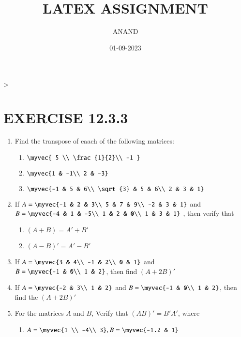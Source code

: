 \documentclass{article}
\theoremstyle{remark}
\begin{document}
\title{LATEX ASSIGNMENT}
\author{ANAND}
\date{01-09-2023}
\maketitle                                                                       >
\section*{EXERCISE 12.3.3}
\begin{enumerate}
\item Find the transpose of eaach of the following matrices:
\begin{enumerate}[label=(\roman*)]
\item $\myvec{ 5 \\ \frac{1}{2}\\ -1 }$
\item $\myvec {1 & -1\\ 2 & -3}$
\item $\myvec{-1 & 5 & 6\\ \sqrt{3} & 5 & 6\\ 2 & 3 & 1}$
\end{enumerate}
\item If $A=\myvec {-1 & 2 & 3\\ 5 & 7 & 9\\ -2 & 3 & 1}$ and $B= \myvec{-4 & 1 & -5\\ 1 & 2 & 0\\ 1 & 3 & 1}$
, then verify that
\begin{enumerate}
\item $(A+B)=A'+B'$
\item $(A-B)'=A'-B'$
\end{enumerate}
\item If $A=\myvec{3 & 4\\ -1 & 2\\ 0 & 1}$ and $B=\myvec{-1 & 0\\ 1 & 2}$, then find $(A+2B)'$
\item If $A=\myvec{-2 & 3\\ 1 & 2}$ and $B=\myvec{-1 & 0\\ 1 & 2} $, then find the $(A+2B)'$
\item For the matrices $A$ and $B$, Verify that $(AB)'= B'A'$, where 
\begin{enumerate}[label=(\roman*)]
\item $A=\myvec {1 \\ -4\\  3} , B=\myvec {-1.2 & 1}$

\end{enumerate}
\end{enumerate}
\end{document}
